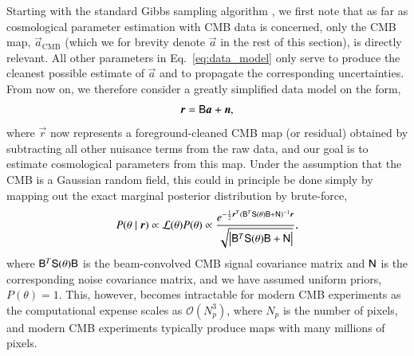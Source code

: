 \documentclass[twocolumn]{../common/aa}
\newcommand{\B}[0]{\tens{B}}
\newcommand{\n}[0]{\vec{n}}
\renewcommand{\a}[0]{\vec{a}}
\newcommand{\N}[0]{\tens{N}}
\renewcommand{\S}[0]{\tens{S}}
\renewcommand{\r}[0]{\vec{r}}
\begin{document}
Starting with the standard Gibbs sampling algorithm \citep{jewell2004,wandelt2004}, we first note that as far as cosmological parameter estimation with CMB data is concerned, only the CMB map, $\a_{\mathrm{CMB}}$ (which we for brevity denote $\a$ in the rest of this section), is directly relevant. All other parameters in Eq.~\eqref{eq:data_model} only serve to produce the cleanest possible estimate of $\a$ and to propagate the corresponding uncertainties. From now on, we therefore consider a greatly simplified data model on the form,
\begin{equation}
  \r = \B\a + \n,
\end{equation}
where $\r$ now represents a foreground-cleaned CMB map (or residual) obtained by subtracting all other nuisance terms from the raw data, and our goal is to estimate cosmological parameters from this map. Under the assumption that the CMB is a Gaussian random field, this could in principle be done simply by mapping out the exact marginal posterior distribution by brute-force,
\begin{equation}
  P(\theta \mid \r) \propto \mathcal{L}(\theta)P(\theta) \propto \frac{e^{-\frac12 \r^T (\B^T \S(\theta) \B + \N)^{-1}\r}}{\sqrt{\left|\B^T \S(\theta) \B + \N\right|}},
  \label{eq:exact_posterior}
\end{equation}
where $\B^T \S(\theta) \B$ is the beam-convolved CMB signal covariance matrix and $\N$ is the corresponding noise covariance matrix, and we have assumed uniform priors, $P(\theta) = 1$. This, however, becomes intractable for modern CMB experiments as the computational expense scales as $\mathcal{O}(N_p^3)$, where $N_p$ is the number of pixels, and modern CMB experiments typically produce maps with many millions of pixels. 
\end{document}
